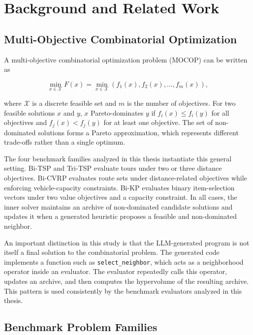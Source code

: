 \chapter{Background and Related Work}

\section{Multi-Objective Combinatorial Optimization}

A multi-objective combinatorial optimization problem (MOCOP) can be written as

\begin{equation}
  \min_{x \in \mathcal{X}} F(x)
  =
  \min_{x \in \mathcal{X}} \left(f_1(x), f_2(x), \ldots, f_m(x)\right),
\end{equation}

where $\mathcal{X}$ is a discrete feasible set and $m$ is the number of objectives. For two feasible solutions $x$ and $y$, $x$ Pareto-dominates $y$ if $f_i(x) \le f_i(y)$ for all objectives and $f_j(x) < f_j(y)$ for at least one objective. The set of non-dominated solutions forms a Pareto approximation, which represents different trade-offs rather than a single optimum.

The four benchmark families analyzed in this thesis instantiate this general setting. Bi-TSP and Tri-TSP evaluate tours under two or three distance objectives. Bi-CVRP evaluates route sets under distance-related objectives while enforcing vehicle-capacity constraints. Bi-KP evaluates binary item-selection vectors under two value objectives and a capacity constraint. In all cases, the inner solver maintains an archive of non-dominated candidate solutions and updates it when a generated heuristic proposes a feasible and non-dominated neighbor.

An important distinction in this study is that the LLM-generated program is not itself a final solution to the combinatorial problem. The generated code implements a function such as \texttt{select\_neighbor}, which acts as a neighborhood operator inside an evaluator. The evaluator repeatedly calls this operator, updates an archive, and then computes the hypervolume of the resulting archive. This pattern is used consistently by the benchmark evaluators analyzed in this thesis.

\section{Benchmark Problem Families}

